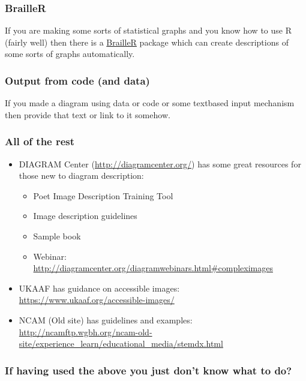 \documentclass[
  17pt,
  english,
  a4paper]{extarticle}
\providecommand{\tightlist}{%
  \setlength{\itemsep}{0pt}\setlength{\parskip}{0pt}}
\theoremstyle{plain}
\theoremstyle{plain}
\theoremstyle{plain}
\theoremstyle{plain}
\theoremstyle{plain}
\theoremstyle{definition}
\theoremstyle{definition}
\theoremstyle{definition}
\theoremstyle{remark}
\renewcommand{\;}{\,}
\begin{document}
\hypertarget{brailler}{%
\subsubsection{BrailleR}\label{brailler}}

If you are making some sorts of statistical graphs and you know how to use R (fairly well) then there is a \href{https://github.com/ajrgodfrey/BrailleR}{BrailleR} package which can create descriptions of some sorts of graphs automatically.

\hypertarget{output-from-code-and-data}{%
\subsubsection{Output from code (and data)}\label{output-from-code-and-data}}

If you made a diagram using data or code or some textbased input mechanism then provide that text or link to it somehow.

\hypertarget{all-of-the-rest}{%
\subsubsection{All of the rest}\label{all-of-the-rest}}

\begin{itemize}
\tightlist
\item
  DIAGRAM Center (\url{http://diagramcenter.org/}) has some great resources for those new to diagram description:

  \begin{itemize}
  \tightlist
  \item
    Poet Image Description Training Tool
  \item
    Image description guidelines
  \item
    Sample book
  \item
    Webinar: \url{http://diagramcenter.org/diagramwebinars.html\#compleximages}
  \end{itemize}
\item
  UKAAF has guidance on accessible images: \url{https://www.ukaaf.org/accessible-images/}
\item
  NCAM (Old site) has guidelines and examples: \url{http://ncamftp.wgbh.org/ncam-old-site/experience_learn/educational_media/stemdx.html}
\end{itemize}

\hypertarget{if-having-used-the-above-you-just-dont-know-what-to-do}{%
\subsubsection{If having used the above you just don't know what to do?}\label{if-having-used-the-above-you-just-dont-know-what-to-do}}
\end{document}
